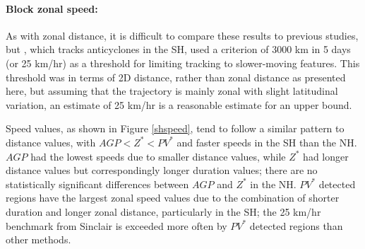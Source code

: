 \documentclass[smallextended]{svjour3}       %
\numberwithin{equation}{section}
\begin{document}

\paragraph{Block zonal speed:} As with zonal distance, it is difficult to compare these results to previous studies, but \cite{sinclair_climatology_1996}, which tracks anticyclones in the SH, used a criterion of 3000 km in 5 days (or 25 km/hr) as a threshold for limiting tracking to slower-moving features. This threshold was in terms of 2D distance, rather than zonal distance as presented here, but assuming that the trajectory is mainly zonal with slight latitudinal variation, an estimate of 25 km/hr is a reasonable estimate for an upper bound. 

Speed values, as shown in Figure \ref{shspeed}, tend to follow a similar pattern to distance values, with $AGP<Z^*<PV^*$ and faster speeds in the SH than the NH. $AGP$ had the lowest speeds due to smaller distance values, while $Z^*$ had longer distance values but correspondingly longer duration values; there are no statistically significant differences between $AGP$ and $Z^*$ in the NH. $PV^*$ detected regions have the largest zonal speed values due to the combination of shorter duration and longer zonal distance, particularly in the SH; the 25 km/hr benchmark from Sinclair is exceeded more often by $PV^*$ detected regions than other methods.
\end{document}
